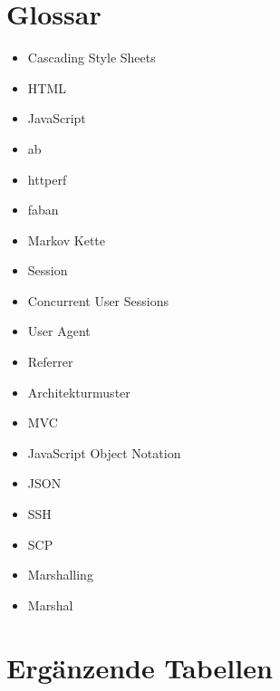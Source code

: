 \documentclass[10pt]{scrartcl}
\begin{document}
  \section{Glossar}
  \begin{itemize}
    \item Cascading Style Sheets
    \item HTML
    \item JavaScript
    \item ab
    \item httperf
    \item faban
    \item Markov Kette
    \item Session
    \item Concurrent User Sessions
    \item User Agent
    \item Referrer
    \item Architekturmuster
    \item MVC
    \item JavaScript Object Notation
    \item JSON
    \item SSH
    \item SCP
    \item Marshalling
    \item Marshal
  \end{itemize}
  
  \appendix
  
  \section{Ergänzende Tabellen}
  
\end{document}

